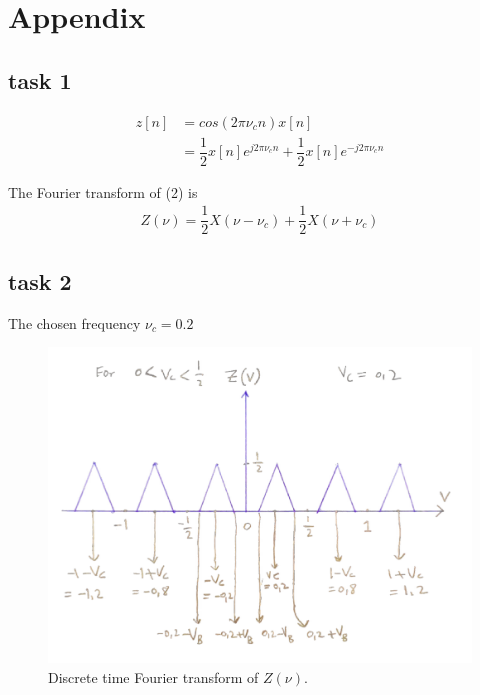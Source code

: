 \documentclass[a4paper,twocolumn]{article}
\begin{document}
\section*{Appendix}
\renewcommand{\thesubsection}{\Alph{subsection}}
\subsection{task 1}

\begin{equation}
\begin{aligned}
z[n] &= cos(2\pi \nu_cn)x[n] \\
&= \dfrac{1}{2} x[n]e^{j2\pi \nu_cn} + \dfrac{1}{2}x[n]e^{-j2\pi \nu_cn}
 \end{aligned}    
\end{equation}

The Fourier transform of (2) is 
\begin{equation}
\begin{aligned}
Z(\nu) = \dfrac{1}{2}X(\nu - \nu_c) + \dfrac{1}{2}X(\nu + \nu_c)
 \end{aligned}    
\end{equation}

\subsection{task 2}
The chosen frequency $\nu_c = 0.2$

\begin{figure}[H]
  \begin{center}
    \includegraphics[width=0.83\columnwidth]{task2corped.pdf}
  \end{center}
  \caption{Discrete time Fourier transform of $Z(\nu)$.}
  \label{fig:prestanda}
\end{figure}
\end{document}
